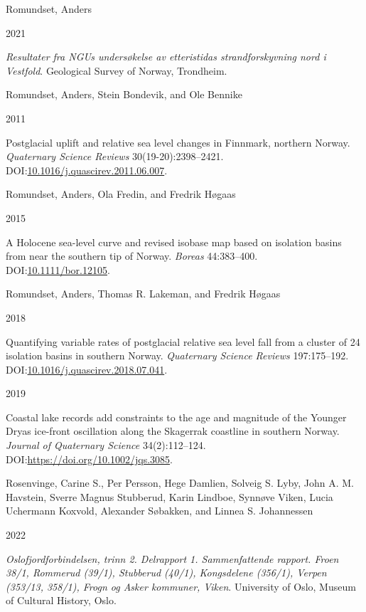 \documentclass[
  12pt,
  a4paper,
  oneside]{book}
\newlength{\cslhangindent}
\newlength{\csllabelwidth}
\newlength{\cslentryspacingunit} %
\newenvironment{CSLReferences}[2] %
 {%
  \setlength{\parindent}{0pt}
  \ifodd #1
  \let\oldpar\par
  \def\par{\hangindent=\cslhangindent\oldpar}
  \fi
  \setlength{\parskip}{#2\cslentryspacingunit}
 }%
 {}
\newcommand{\CSLBlock}[1]{#1\hfill\break}
\newcommand{\CSLLeftMargin}[1]{\parbox[t]{\csllabelwidth}{#1}}
\newcommand{\CSLRightInline}[1]{\parbox[t]{\linewidth - \csllabelwidth}{#1}\break}
\begin{document}
\begin{CSLReferences}{0}{0}
\leavevmode{}%
\CSLBlock{Romundset, Anders}
\CSLLeftMargin{ 2021}%
\CSLRightInline{\emph{{Resultater fra NGUs undersøkelse av etteristidas strandforskyvning nord i Vestfold}}. Geological Survey of Norway, Trondheim.}

\leavevmode{}%
\CSLBlock{Romundset, Anders, Stein Bondevik, and Ole Bennike}
\CSLLeftMargin{ 2011}%
\CSLRightInline{Postglacial uplift and relative sea level changes in Finnmark, northern Norway. \emph{Quaternary Science Reviews} 30(19-20):2398--2421. DOI:\href{https://doi.org/10.1016/j.quascirev.2011.06.007}{10.1016/j.quascirev.2011.06.007}.}

\leavevmode{}%
\CSLBlock{Romundset, Anders, Ola Fredin, and Fredrik Høgaas}
\CSLLeftMargin{ 2015}%
\CSLRightInline{A Holocene sea{-}level curve and revised isobase map based on isolation basins from near the southern tip of Norway. \emph{Boreas} 44:383--400. DOI:\href{https://doi.org/10.1111/bor.12105}{10.1111/bor.12105}.}

\leavevmode{}%
\CSLBlock{Romundset, Anders, Thomas R. Lakeman, and Fredrik Høgaas}
\CSLLeftMargin{ 2018}%
\CSLRightInline{Quantifying variable rates of postglacial relative sea level fall from a cluster of 24 isolation basins in southern Norway. \emph{Quaternary Science Reviews} 197:175--192. DOI:\href{https://doi.org/10.1016/j.quascirev.2018.07.041}{10.1016/j.quascirev.2018.07.041}.}

\leavevmode{}%
\CSLLeftMargin{ 2019 }%
\CSLRightInline{Coastal lake records add constraints to the age and magnitude of the Younger Dryas ice-front oscillation along the Skagerrak coastline in southern Norway. \emph{Journal of Quaternary Science} 34(2):112--124. DOI:\url{https://doi.org/10.1002/jqs.3085}.}

\leavevmode{}%
\CSLBlock{Rosenvinge, Carine S., Per Persson, Hege Damlien, Solveig S. Lyby, John A. M. Havstein, Sverre Magnus Stubberud, Karin Lindboe, Synnøve Viken, Lucia Uchermann Koxvold, Alexander Søbakken, and Linnea S. Johannessen}
\CSLLeftMargin{ 2022}%
\CSLRightInline{\emph{{Oslofjordforbindelsen, trinn 2. Delrapport 1. Sammenfattende rapport. Froen 38/1, Rommerud (39/1), Stubberud (40/1), Kongsdelene (356/1), Verpen (353/13, 358/1), Frogn og Asker kommuner, Viken}}. University of Oslo, Museum of Cultural History, Oslo.}


\end{CSLReferences}
\end{document}
